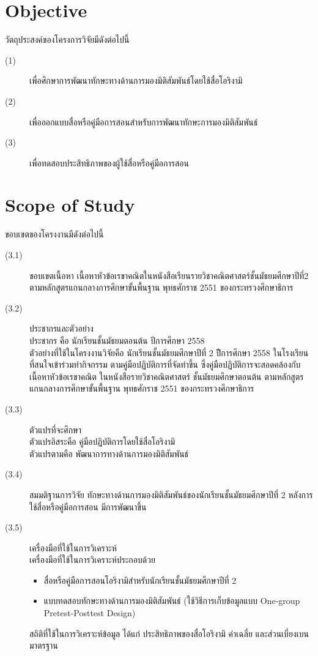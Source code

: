\documentclass[hidelinks,a4paper,14pt]{article}
\numberwithin{equation}{section}							%
\begin{document}
\section{Objective}
วัตถุประสงค์ของโครงการวิจัยมีดังต่อไปนี้

\begin{description}
	\item[(1)] เพื่อศึกษาการพัฒนาทักษะทางด้านการมองมิติสัมพันธ์โดยใช้สื่อโอริงามิ
	\item[(2)] เพื่อออกแบบสื่อหรือคู่มือการสอนสำหรับการพัฒนาทักษะการมองมิติสัมพันธ์
	\item[(3)]  เพื่อทดสอบประสิทธิภาพของผู้ใช้สื่อหรือคู่มือการสอน
\end{description}

\section{Scope of Study}
ขอบเขตของโครงงานมีดังต่อไปนี้
\begin{description}
\item[(3.1)] ขอบเขตเนื้อหา
เนื้อหาหัวข้อเรขาคณิตในหนังสือเรียนรายวิชาคณิตศาสตร์ชั้นมัธยมศึกษาปีที่2 ตามหลักสูตรแกนกลางการศึกษาขั้นพื้นฐาน พุทธศักราช 2551 ของกระทรวงศึกษาธิการ
\item[(3.2)]  ประชากรและตัวอย่าง\\
ประชากร คือ นักเรียนชั้นมัธยมตอนต้น ปีการศึกษา 2558\\
ตัวอย่างที่ใช้ในโครงงานวิจัยคือ นักเรียนชั้นมัธยมศึกษาปีที่ 2 ปีีการศึกษา 2558 ในโรงเรียนที่สนใจเข้าร่วมทำกิจกรรม ตามคู่มือปฏิบัติการที่จัดทำขึ้น ซึ่งคู่มือปฏิบัติการจะสอดคล้องกับเนื้อหาหัวข้อเรขาคณิต ในหนังสือรายวิชาคณิตศาสตร์ ชั้นมัธยมศึกษาตอนต้น ตามหลักสูตรแกนกลางการศึกษาขั้นพื้นฐาน พุทธศักราช 2551 ของกระทรวงศึกษาธิการ
\item[(3.3)]  ตัวแปรที่จะศึกษา\\
ตัวแปรอิสระคือ คู่มือปฏิบัติการโดยใช้สื่อโอริงามิ\\
ตัวแปรตามคือ พัฒนาการทางด้านการมองมิติสัมพันธ์
\item[(3.4)]  สมมติฐานการวิจัย
ทักษะทางด้านการมองมิติสัมพันธ์ของนักเรียนชั้นมัธยมศึกษาปีที่ 2 หลังการใช้สื่อหรือคู่มือการสอน มีการพัฒนาขึ้น
\item[(3.5)]  เครื่องมือที่ใช้ในการวิเคราะห์\\
เครื่องมือที่ใช้ในการวิเคราะห์ประกอบด้วย
\begin{itemize}
	\item สื่อหรือคู่มือการสอนโอริงามิสำหรับนักเรียนชั้นมัธยมศึกษาปีที่ 2
	\item แบบทดสอบทักษะทางด้านการมองมิติสัมพันธ์ (ใช้วิธีการเก็บข้อมูลแบบ One-group
	Pretest-Posttest Design)
\end{itemize}
สถิติที่ใช้ในการวิเคราะห์ข้อมูล ได้แก่ ประสิทธิภาพของสื่อโอริงามิ ค่าเฉลี่ย และส่วนเบี่ยงเบนมาตรฐาน
\end{description}
\end{document}
